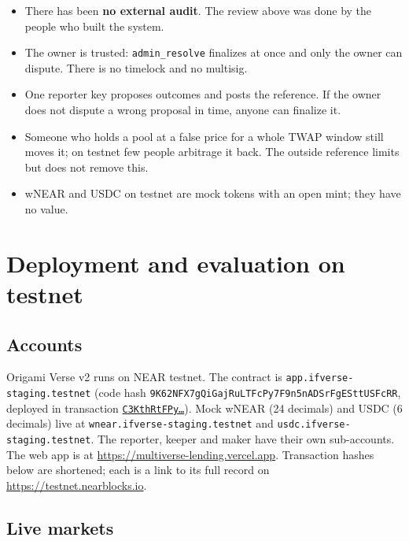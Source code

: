 \documentclass[11pt,a4paper]{article}
\newcommand{\code}[1]{\texttt{\small #1}}
\newcommand{\tx}[2]{\href{https://testnet.nearblocks.io/txns/#1}{\code{#2\ldots}}}
\begin{document}
\begin{itemize}
\item There has been \textbf{no external audit}. The review above was done by the people who built the system.
\item The owner is trusted: \code{admin\_resolve} finalizes at once and only the owner can dispute. There is no
timelock and no multisig.
\item One reporter key proposes outcomes and posts the reference. If the owner does not dispute a wrong proposal in
time, anyone can finalize it.
\item Someone who holds a pool at a false price for a whole TWAP window still moves it; on testnet few people
arbitrage it back. The outside reference limits but does not remove this.
\item wNEAR and USDC on testnet are mock tokens with an open mint; they have no value.
\end{itemize}

\section{Deployment and evaluation on testnet}
\label{sec:eval}

\subsection{Accounts}

Origami Verse v2 runs on NEAR testnet. The contract is \code{app.ifverse-staging.testnet} (code hash
\code{9K62NFX7gQiGajRuLTFcPy7F9n5nADSrFgESttUSFcRR}, deployed in transaction
\tx{C3KthRtFPyJa68XRXNqBjvE6LpTqZfPgKsAo2U73bcpU}{C3KthRtFPy}). Mock wNEAR (24 decimals) and USDC (6 decimals) live at
\code{wnear.ifverse-staging.testnet} and \code{usdc.ifverse-staging.testnet}. The reporter, keeper and maker have their own sub-accounts. The
web app is at \url{https://multiverse-lending.vercel.app}. Transaction hashes below are shortened; each is a link
to its full record on \url{https://testnet.nearblocks.io}.

\subsection{Live markets}
\end{document}
